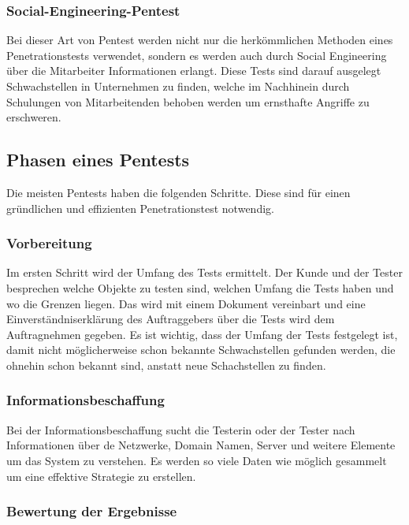 \subsubsection{Social-Engineering-Pentest}

Bei dieser Art von Pentest werden nicht nur die herkömmlichen Methoden eines Penetrationstests verwendet, sondern es werden auch durch Social Engineering über die Mitarbeiter Informationen erlangt. Diese Tests sind darauf ausgelegt Schwachstellen in Unternehmen zu finden, welche im Nachhinein durch Schulungen von Mitarbeitenden behoben werden um ernsthafte Angriffe zu erschweren.

\subsection{Phasen eines Pentests}

Die meisten Pentests haben die folgenden Schritte. Diese sind für einen gründlichen und effizienten Penetrationstest notwendig.

\subsubsection{Vorbereitung}

Im ersten Schritt wird der Umfang des Tests ermittelt. Der Kunde und der Tester besprechen welche Objekte zu testen sind, welchen Umfang die Tests haben und wo die Grenzen liegen. Das wird mit einem Dokument vereinbart und eine Einverständniserklärung des Auftraggebers über die Tests wird dem Auftragnehmen gegeben. Es ist wichtig, dass der Umfang der Tests festgelegt ist, damit nicht möglicherweise schon bekannte Schwachstellen gefunden werden, die ohnehin schon bekannt sind, anstatt neue Schachstellen zu finden.

\subsubsection{Informationsbeschaffung}

Bei der Informationsbeschaffung sucht die Testerin oder der Tester nach Informationen über de Netzwerke, Domain Namen, Server und weitere Elemente um das System zu verstehen. Es werden so viele Daten wie möglich gesammelt um eine effektive Strategie zu erstellen. 

\subsubsection{Bewertung der Ergebnisse}

